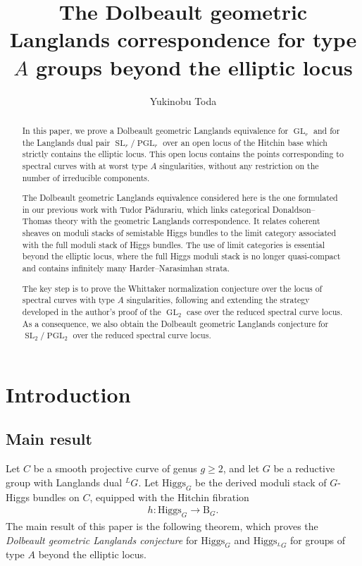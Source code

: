 \documentclass[11pt,oneside,a4paper,mathscr]{amsart}
\title[The Dolbeault geometric Langlands beyond the elliptic locus]{The Dolbeault geometric Langlands correspondence for type \texorpdfstring{$A$}{A} groups
beyond the elliptic locus}
\author{Yukinobu Toda}
\theoremstyle{definition}
\renewcommand{\geq}{\geqslant}
\newcommand{\rB}{\mathrm{B}}
\newcommand{\GL}{\operatorname{GL}}
\newcommand{\SL}{\operatorname{SL}}
\newcommand{\PGL}{\operatorname{PGL}}
\newcommand{\Hig}{\mathrm{Higgs}}
\begin{document}
\begin{abstract}
In this paper, we prove a Dolbeault geometric Langlands equivalence for $\GL_r$
and for the Langlands dual pair $\SL_r/\PGL_r$ over an open locus of the
Hitchin base which strictly contains the elliptic locus. This open locus contains the points corresponding to spectral curves with at worst 
type $A$ singularities, without any restriction on the number of irreducible components. 

The Dolbeault geometric Langlands equivalence considered here is the one
formulated in our previous work with Tudor P\u{a}durariu, which links categorical Donaldson--Thomas theory with the geometric Langlands correspondence. It relates coherent
sheaves on moduli stacks of semistable Higgs bundles to the limit category
associated with the full moduli stack of Higgs bundles. The use of limit
categories is essential beyond the elliptic locus, where the full Higgs moduli
stack is no longer quasi-compact and contains infinitely many
Harder--Narasimhan strata.

The key step is to prove the Whittaker normalization conjecture over the locus
of spectral curves with type $A$ singularities, following and extending the
strategy developed in the author's proof of the $\GL_2$ case over the reduced
spectral curve locus. As a consequence, we also obtain the Dolbeault geometric
Langlands conjecture for $\SL_2/\PGL_2$ over the reduced spectral curve locus.


\end{abstract}



\maketitle

 \setcounter{tocdepth}{2}
\tableofcontents


\section{Introduction}

\subsection{Main result}
Let $C$ be a smooth projective curve of genus $g\geq 2$, and let $G$ be a reductive group with Langlands
dual ${}^{L}G$.
Let $\Hig_G$ be the derived moduli stack of $G$-Higgs bundles on $C$, 
equipped with the Hitchin fibration
\begin{align*}
    h\colon \Hig_G \to \rB_G. 
\end{align*}
The main result of this paper is the following theorem, which proves the
\textit{Dolbeault geometric Langlands conjecture} for $\Hig_G$ and
$\Hig_{{}^{L}G}$ for groups of type $A$ beyond the elliptic locus.
\end{document}
